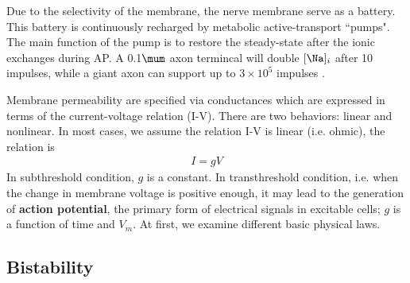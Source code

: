 Due to the selectivity of the membrane, the nerve membrane serve as a battery.
This battery is continuously recharged by metabolic active-transport
``pumps". The main function of the pump is to restore the steady-state after the
ionic exchanges during AP. A 0.1$\mum$ axon termincal will double $[\Na]_i$
after 10 impulses, while a giant axon can support up to $3\times 10^5$ impulses
\citep{ehrenstein1972}.

Membrane permeability are specified via conductances which are
expressed in terms of the current-voltage relation (I-V). There are
two behaviors: linear and nonlinear. In most cases, we assume the
relation I-V is linear (i.e. ohmic), the relation is
\begin{eqnarray*}
  I = gV
\end{eqnarray*}
In subthreshold condition, $g$ is a constant. In transthreshold
condition, i.e. when the change in membrane voltage is positive
enough, it may lead to the generation of {\bf action potential}, the
primary form of electrical signals in excitable cells; $g$ is a
function of time and $V_m$. At first, we examine different basic
physical laws.




\subsection{Bistability}
\label{sec:bistability}

